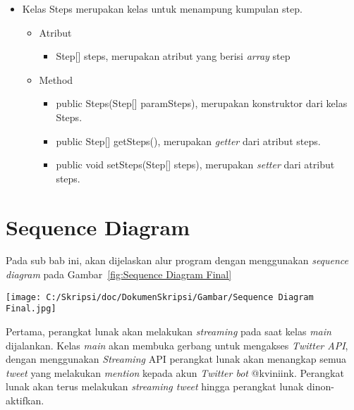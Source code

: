 \begin{itemize}
		\item Kelas Steps merupakan kelas untuk menampung kumpulan step.
		
		
				\begin{itemize}
							\item Atribut
					
					
									\begin{itemize}
												\item Step[] steps, merupakan atribut yang berisi \textit{array} step
									\end{itemize}
					
							\item Method
					
					
									\begin{itemize}
												\item public Steps(Step[] paramSteps), merupakan konstruktor dari kelas Steps.
												\item public Step[] getSteps(), merupakan \textit{getter} dari atribut steps.
												\item public void setSteps(Step[] steps), merupakan \textit{setter} dari atribut steps.
									\end{itemize}
				\end{itemize}
\end{itemize}


\section{Sequence Diagram}
Pada sub bab ini, akan dijelaskan alur program dengan menggunakan \textit{sequence diagram} pada Gambar~\ref{fig:Sequence Diagram Final}

\begin{sidewaysfigure}[htbp]
	\centering
		\texttt{[image: C:/Skripsi/doc/DokumenSkripsi/Gambar/Sequence Diagram Final.jpg]}
	\caption{Sequence Diagram \textit{Twitter bot} untuk Mencari Jalur Transportasi Publik}
	\label{fig:Sequence Diagram Final}
\end{sidewaysfigure}


Pertama, perangkat lunak akan melakukan \textit{streaming} pada saat kelas \textit{main} dijalankan. Kelas \textit{main} akan membuka gerbang untuk mengakses \textit{Twitter API}, dengan menggunakan \textit{Streaming} API perangkat lunak akan menangkap semua \textit{tweet} yang melakukan \textit{mention} kepada akun \textit{Twitter bot} @kviniink. Perangkat lunak akan terus melakukan \textit{streaming tweet} hingga perangkat lunak dinon-aktifkan.

